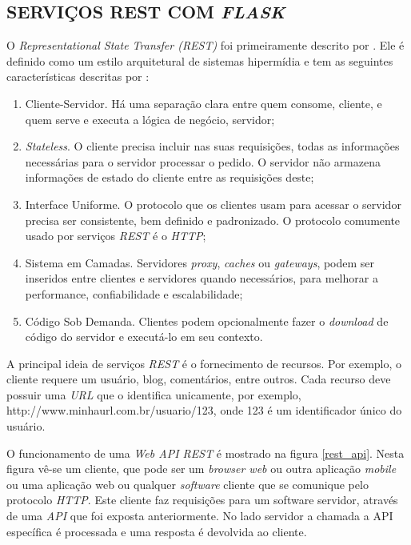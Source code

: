 \subsection{SERVIÇOS REST COM \emph{FLASK}}
\label{servicos_rest}

O \emph{Representational State Transfer (REST)} foi primeiramente descrito por . 
Ele é definido como um estilo arquitetural de sistemas hipermídia e tem as seguintes características descritas por :

\begin{enumerate}
	\item Cliente-Servidor. Há uma separação clara entre quem consome, cliente, e quem serve e executa a lógica de negócio, servidor;
	\item \emph{Stateless}. O cliente precisa incluir nas suas requisições, todas as informações necessárias para o servidor processar o pedido. O servidor não armazena informações de estado do cliente entre as requisições deste;
	\item Interface Uniforme. O protocolo que os clientes usam para acessar o servidor precisa ser consistente, bem definido e padronizado. O protocolo comumente usado por serviços \emph{REST} é o \emph{HTTP};
	\item Sistema em Camadas. Servidores \emph{proxy}, \emph{caches} ou \emph{gateways}, podem ser inseridos entre clientes e servidores quando necessários, para melhorar a performance, confiabilidade e escalabilidade;
	\item Código Sob Demanda. Clientes podem opcionalmente fazer o \emph{download} de código do servidor e executá-lo em seu contexto.
\end{enumerate}

A principal ideia de serviços \emph{REST} é o fornecimento de recursos. 
Por exemplo, o cliente requere um usuário, blog, comentários, entre outros. 
Cada recurso deve possuir uma \emph{URL} que o identifica unicamente, por exemplo, http://www.minhaurl.com.br/usuario/123, onde 123 é um identificador único do usuário.

O funcionamento de uma \emph{Web API REST} é mostrado na figura \ref{rest_api}. Nesta figura vê-se um cliente, que pode ser um \emph{browser web} ou outra aplicação \emph{mobile} ou uma aplicação web ou qualquer \emph{software} cliente que se comunique pelo protocolo \emph{HTTP}. Este cliente faz requisições para um software servidor, através de uma \emph{API} que foi exposta anteriormente. No lado servidor a chamada a API específica é processada e uma resposta é devolvida ao cliente.

